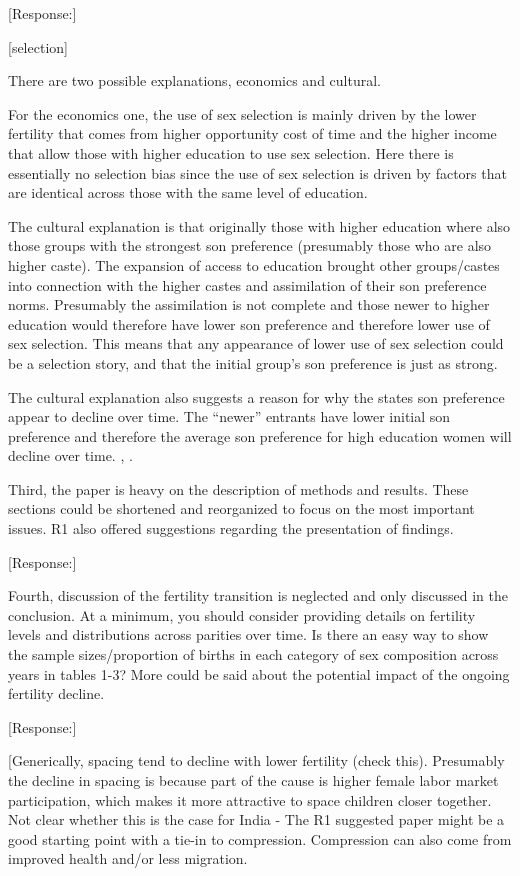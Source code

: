 \documentclass[letterpaper,12pt]{article}
\begin{document}
[Response:]


[selection]

There are two possible explanations, economics and cultural.

For the economics one, the use of sex selection is mainly driven by the lower fertility
that comes from higher opportunity cost of time and the higher income that allow those
with higher education to use sex selection.
Here there is essentially no selection bias since the use of sex selection is driven
by factors that are identical across those with the same level of education.

The cultural explanation is that originally those with higher education where also those
groups with the strongest son preference (presumably those who are also higher caste).
The expansion of access to education brought other groups/castes into connection with
the higher castes and assimilation of their son preference norms.
Presumably the assimilation is not complete and those newer to higher education would
therefore have lower son preference and therefore lower use of sex selection.
This means that any appearance of lower use of sex selection could be a selection story,
and that the initial group's son preference is just as strong.

The cultural explanation also suggests a reason for why the states son preference 
appear to decline over time.
The ``newer'' entrants have lower initial son preference and therefore the average
son preference for high education women will decline over time.
\citep{bhat03}, \citep{pande07}.



Third, the paper is heavy on the description of methods and results.
These sections could be shortened and reorganized to focus on the most
important issues. R1 also offered suggestions regarding the presentation
of findings.

[Response:]

Fourth, discussion of the fertility transition is neglected and only
discussed in the conclusion. At a minimum, you should consider providing
details on fertility levels and distributions across parities over time.
Is there an easy way to show the sample sizes/proportion of births in
each category of sex composition across years in tables 1-3? More could
be said about the potential impact of the ongoing fertility decline.

[Response:]




[Generically, spacing tend to decline with lower fertility (check this). 
Presumably the decline in spacing is because part of the cause is higher female labor 
market participation, which makes it more attractive to space children closer together.
Not clear whether this is the case for India - The R1 suggested paper might be a good
starting point with a tie-in to compression.
Compression can also come from improved health and/or less migration.
\end{document}
